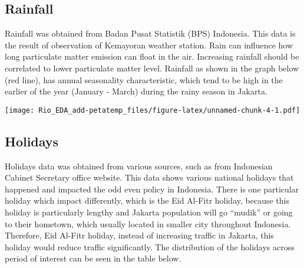 \documentclass[
]{article}
\begin{document}
\hypertarget{rainfall}{%
\subsection{Rainfall}\label{rainfall}}

Rainfall was obtained from Badan Pusat Statistik (BPS) Indonesia. This
data is the result of observation of Kemayoran weather station. Rain can
influence how long particulate matter emission can float in the air.
Increasing rainfall should be correlated to lower particulate matter
level. Rainfall as shown in the graph below (red line), has annual
seasonality characteristic, which tend to be high in the earlier of the
year (January - March) during the rainy season in Jakarta.

\texttt{[image: Rio\_EDA\_add-petatemp\_files/figure-latex/unnamed-chunk-4-1.pdf]}

\hypertarget{holidays}{%
\subsection{Holidays}\label{holidays}}

Holidays data was obtained from various sources, such as from Indonesian
Cabinet Secretary office website. This data shows various national
holidays that happened and impacted the odd even policy in Indonesia.
There is one particular holiday which impact differently, which is the
Eid Al-Fitr holiday, because this holiday is particularly lengthy and
Jakarta population will go ``mudik'' or going to their hometown, which
usually located in smaller city throughout Indonesia. Therefore, Eid
Al-Fitr holiday, instead of increasing traffic in Jakarta, this holiday
would reduce traffic significantly. The distribution of the holidays
across period of interest can be seen in the table below.
\end{document}
